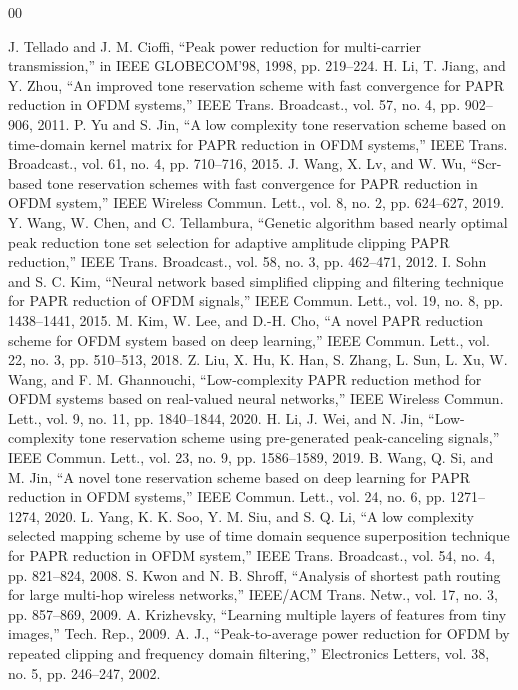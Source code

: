 \documentclass[conference]{IEEEtran}
\begin{document}
\begin{thebibliography}{00}

 J. Tellado and J. M. Cioffi, “Peak power reduction for multi-carrier transmission,” in IEEE GLOBECOM’98, 1998, pp. 219–224.
 H. Li, T. Jiang, and Y. Zhou, “An improved tone reservation scheme with fast convergence for PAPR reduction in OFDM systems,” IEEE Trans. Broadcast., vol. 57, no. 4, pp. 902–906, 2011.
 P. Yu and S. Jin, “A low complexity tone reservation scheme based on time-domain kernel matrix for PAPR reduction in OFDM systems,” IEEE Trans. Broadcast., vol. 61, no. 4, pp. 710–716, 2015.
 J. Wang, X. Lv, and W. Wu, “Scr-based tone reservation schemes with fast convergence for PAPR reduction in OFDM system,” IEEE Wireless Commun. Lett., vol. 8, no. 2, pp. 624–627, 2019.
 Y. Wang, W. Chen, and C. Tellambura, “Genetic algorithm based nearly optimal peak reduction tone set selection for adaptive amplitude clipping PAPR reduction,” IEEE Trans. Broadcast., vol. 58, no. 3, pp. 462–471, 2012.
 I. Sohn and S. C. Kim, “Neural network based simplified clipping and filtering technique for PAPR reduction of OFDM signals,” IEEE Commun. Lett., vol. 19, no. 8, pp. 1438–1441, 2015.
 M. Kim, W. Lee, and D.-H. Cho, “A novel PAPR reduction scheme for OFDM system based on deep learning,” IEEE Commun. Lett., vol. 22, no. 3, pp. 510–513, 2018.
 Z. Liu, X. Hu, K. Han, S. Zhang, L. Sun, L. Xu, W. Wang, and F. M. Ghannouchi, “Low-complexity PAPR reduction method for OFDM systems based on real-valued neural networks,” IEEE Wireless Commun. Lett., vol. 9, no. 11, pp. 1840–1844, 2020.
 H. Li, J. Wei, and N. Jin, “Low-complexity tone reservation scheme using pre-generated peak-canceling signals,” IEEE Commun. Lett., vol. 23, no. 9, pp. 1586–1589, 2019.
 B. Wang, Q. Si, and M. Jin, “A novel tone reservation scheme based on deep learning for PAPR reduction in OFDM systems,” IEEE Commun. Lett., vol. 24, no. 6, pp. 1271–1274, 2020.
 L. Yang, K. K. Soo, Y. M. Siu, and S. Q. Li, “A low complexity selected mapping scheme by use of time domain sequence superposition technique for PAPR reduction in OFDM system,” IEEE Trans. Broadcast., vol. 54, no. 4, pp. 821–824, 2008.
 S. Kwon and N. B. Shroff, “Analysis of shortest path routing for large multi-hop wireless networks,” IEEE/ACM Trans. Netw., vol. 17, no. 3, pp. 857–869, 2009.
 A. Krizhevsky, “Learning multiple layers of features from tiny images,” Tech. Rep., 2009.
 A. J., “Peak-to-average power reduction for OFDM by repeated clipping and frequency domain filtering,” Electronics Letters, vol. 38, no. 5, pp. 246–247, 2002.

\end{thebibliography}
\end{document}
